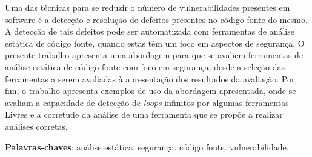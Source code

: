 \begin{resumo}

Uma das técnicas para se reduzir o número de vulnerabilidades presentes em
software é a detecção e resolução de defeitos presentes no código fonte
do mesmo. A detecção de tais defeitos pode ser automatizada com ferramentas de
análise estática de código fonte, quando estas têm um foco em aspectos de
segurança. O presente trabalho apresenta uma abordagem para que se avaliem
ferramentas de análise estática de código fonte com foco em segurança, desde a
seleção das ferramentas a serem avaliadas à apresentação dos resultados da
avaliação. Por fim, o trabalho apresenta exemplos de uso da abordagem
apresentada, onde se avaliam a capacidade de detecção de \textit{loops} 
infinitos por
algumas ferramentas Livres e a corretude da análise de uma ferramenta que se
propõe a realizar análises corretas. 

 \vspace{\onelineskip}
    
 \noindent
 \textbf{Palavras-chaves}: análise estática. segurança. código fonte. vulnerabilidade.
\end{resumo}
